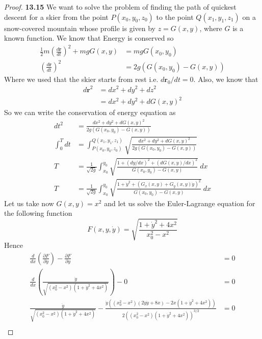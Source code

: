 \documentclass[11pt]{article}
\theoremstyle{definition}
\begin{document}
\begin{proof}{\textbf{13.15}}
    We want to solve the problem of ﬁnding the path of quickest descent for
    a skier from the point $P(x_0, y_0, z_0)$ to the point $Q(x_1, y_1, z_1)$
    on a snow-covered mountain whose proﬁle is given by $z = G(x, y)$,
    where $G$ is a known function. We know that Energy is conserved so
    \begin{align*}
        \frac{1}{2}m\left(\frac{d\bm{r}}{dt}\right)^2 + mgG(x,y)
        &= mgG(x_0, y_0)\\
        \left(\frac{d\bm{r}}{dt}\right)^2
        &= 2g(G(x_0, y_0) - G(x, y))
    \end{align*}
    Where we used that the skier starts from rest i.e. $d\bm{r}_0/dt = 0$.
    Also, we know that
    \begin{align*}
        d\bm{r}^2 &= dx^2 + dy^2 + dz^2\\
        &= dx^2 + dy^2 + dG(x,y)^2
    \end{align*}
    So we can write the conservation of energy equation as
    \begin{align*}
        dt^2 &= \frac{dx^2 + dy^2 + dG(x,y)^2}{2g(G(x_0, y_0) - G(x, y))}\\
        \int_0^T dt &= \int_{P(x_0, y_0, z_0)}^{Q(x_1, y_1, z_1)}
        \sqrt{\frac{dx^2 + dy^2 + dG(x,y)^2}{2g(G(x_0, y_0) - G(x, y))}}\\
        T &= \frac{1}{\sqrt{2g}} \int_{x_0}^{y_0}
        \sqrt{\frac{1 + (dy/dx)^2 + (dG(x,y)/dx)^2}{G(x_0, y_0) - G(x, y)}}~dx\\
        T &= \frac{1}{\sqrt{2g}} \int_{x_0}^{y_0}
        \sqrt{\frac{1 + \dot y^2 + (G_x(x,y) + G_y(x,y)\dot y)^2}
        {G(x_0, y_0) - G(x, y)}}~dx
    \end{align*}
    Let us take now $G(x,y) = x^2$ and let us solve the Euler-Lagrange equation
    for the following function
    $$F(x,y, \dot y) = \sqrt{\frac{1 + \dot y^2 + 4x^2}
    {x_0^2 - x^2}}$$
    Hence
    \begin{align*}
        \frac{d}{dx}\left(\frac{\partial F}{\partial \dot y}\right)
        - \frac{\partial F}{\partial y} &= 0\\
        \frac{d}{dx}\left(\frac{\dot y}{\sqrt{(x_0^2 - x^2)(1 + \dot y^2 + 4x^2)}}
        \right)
        - 0 &= 0\\
        \frac{\ddot y}{\sqrt{(x_0^2 - x^2)(1 + \dot y^2 + 4x^2)}} -
        \frac{\dot y((x_0^2 - x^2)(2\dot y\ddot y + 8x)-2x(1 + \dot y^2 + 4x^2))}
        {2((x_0^2 - x^2)(1 + \dot y^2 + 4x^2))^{3/2}} &= 0\\

\end{align*}
\end{proof}
\end{document}
